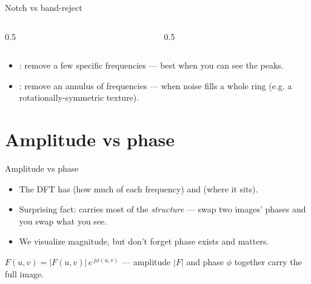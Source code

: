 \documentclass[10pt,aspectratio=169]{beamer}
\begin{document}
\begin{frame}{Notch vs band-reject}
  \begin{columns}[T]
    \begin{column}{0.5\textwidth}\begin{center}
    \end{center}\end{column}
    \begin{column}{0.5\textwidth}\begin{center}
    \end{center}\end{column}
  \end{columns}
  \vspace{4pt}
  \begin{itemize}
    \item {}: remove a few specific frequencies — best when you can see the peaks.
    \item {}: remove an annulus of frequencies — when noise fills a whole ring
          (e.g. a rotationally-symmetric texture).
  \end{itemize}
\end{frame}

\section{Amplitude vs phase}

\begin{frame}{Amplitude vs phase}
  \begin{itemize}
    \item The DFT has  (how much of each frequency) and  (where it sits).
    \item Surprising fact:  carries most of the \emph{structure} — swap two images' phases and you swap what you see.
    \item We visualize magnitude, but don't forget phase exists and matters.
  \end{itemize}
  \begin{mathbox}
    $F(u,v)=|F(u,v)|\,e^{\,j\phi(u,v)}$ — amplitude $|F|$ and phase $\phi$ together carry the full image.
  \end{mathbox}
\end{frame}
\end{document}
